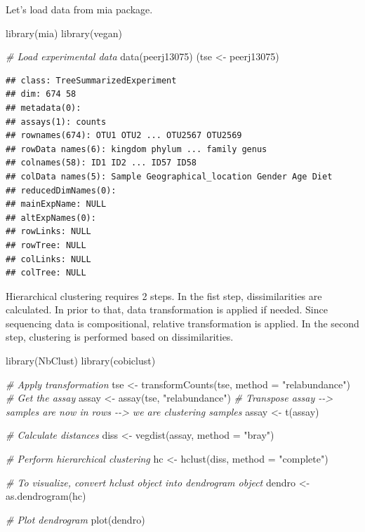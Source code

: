 \documentclass[
]{book}
\newenvironment{Shaded}{\begin{snugshade}}{\end{snugshade}}
\newcommand{\AttributeTok}[1]{\textcolor[rgb]{0.77,0.63,0.00}{#1}}
\newcommand{\CommentTok}[1]{\textcolor[rgb]{0.56,0.35,0.01}{\textit{#1}}}
\newcommand{\FunctionTok}[1]{\textcolor[rgb]{0.00,0.00,0.00}{#1}}
\newcommand{\NormalTok}[1]{#1}
\newcommand{\OtherTok}[1]{\textcolor[rgb]{0.56,0.35,0.01}{#1}}
\newcommand{\StringTok}[1]{\textcolor[rgb]{0.31,0.60,0.02}{#1}}
\begin{document}
Let's load data from mia package.

\begin{Shaded}
\begin{Highlighting}[]
\FunctionTok{library}\NormalTok{(mia)}
\FunctionTok{library}\NormalTok{(vegan)}

\CommentTok{\# Load experimental data}
\FunctionTok{data}\NormalTok{(peerj13075)}
\NormalTok{(tse }\OtherTok{\textless{}{-}}\NormalTok{ peerj13075)}
\end{Highlighting}
\end{Shaded}

\begin{verbatim}
## class: TreeSummarizedExperiment 
## dim: 674 58 
## metadata(0):
## assays(1): counts
## rownames(674): OTU1 OTU2 ... OTU2567 OTU2569
## rowData names(6): kingdom phylum ... family genus
## colnames(58): ID1 ID2 ... ID57 ID58
## colData names(5): Sample Geographical_location Gender Age Diet
## reducedDimNames(0):
## mainExpName: NULL
## altExpNames(0):
## rowLinks: NULL
## rowTree: NULL
## colLinks: NULL
## colTree: NULL
\end{verbatim}

Hierarchical clustering requires 2 steps. In the fist step, dissimilarities are
calculated. In prior to that, data transformation is applied if needed. Since
sequencing data is compositional, relative transformation is applied.
In the second step, clustering is performed based on dissimilarities.

\begin{Shaded}
\begin{Highlighting}[]
\FunctionTok{library}\NormalTok{(NbClust)}
\FunctionTok{library}\NormalTok{(cobiclust)}

\CommentTok{\# Apply transformation}
\NormalTok{tse }\OtherTok{\textless{}{-}} \FunctionTok{transformCounts}\NormalTok{(tse, }\AttributeTok{method =} \StringTok{"relabundance"}\NormalTok{)}
\CommentTok{\# Get the assay}
\NormalTok{assay }\OtherTok{\textless{}{-}} \FunctionTok{assay}\NormalTok{(tse, }\StringTok{"relabundance"}\NormalTok{)}
\CommentTok{\# Transpose assay {-}{-}\textgreater{} samples are now in rows {-}{-}\textgreater{} we are clustering samples}
\NormalTok{assay }\OtherTok{\textless{}{-}} \FunctionTok{t}\NormalTok{(assay)}

\CommentTok{\# Calculate distances}
\NormalTok{diss }\OtherTok{\textless{}{-}} \FunctionTok{vegdist}\NormalTok{(assay, }\AttributeTok{method =} \StringTok{"bray"}\NormalTok{)}

\CommentTok{\# Perform hierarchical clustering}
\NormalTok{hc }\OtherTok{\textless{}{-}} \FunctionTok{hclust}\NormalTok{(diss, }\AttributeTok{method =} \StringTok{"complete"}\NormalTok{)}

\CommentTok{\# To visualize, convert hclust object into dendrogram object}
\NormalTok{dendro }\OtherTok{\textless{}{-}} \FunctionTok{as.dendrogram}\NormalTok{(hc)}

\CommentTok{\# Plot dendrogram}
\FunctionTok{plot}\NormalTok{(dendro)}
\end{Highlighting}
\end{Shaded}
\end{document}
